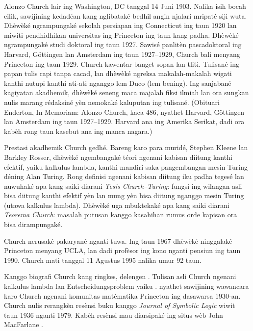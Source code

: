 \documentclass[../../../include/open-logic-section]{subfiles}
\begin{document}



Alonzo Church lair ing Washington, DC tanggal 14 Juni 1903.
Nalika isih bocah cilik, sawijining kedadéan kang nglibataké
bedhil angin njalari mripaté siji wuta. Dhèwèké ngrampungaké
sekolah persiapan ing Connecticut ing taun 1920 lan miwiti
pendhidhikan universitas ing Princeton ing taun kang padha.
Dhèwèké ngrampungaké studi doktoral ing taun 1927. Sawisé
panlitèn pascadoktoral ing Harvard, Göttingen lan Amsterdam
ing taun 1927--1929, Church bali menyang Princeton ing
taun 1929. Church kawentar banget sopan lan tliti.
Tulisané ing papan tulis rapi tanpa cacad, lan dhèwèké
ngreksa makalah-makalah wigati kanthi nutupi kanthi ati-ati
nganggo lem Duco (lem bening). Ing sanjabané kagiyatan
akadhemik, dhèwèké seneng maca majalah fiksi ilmiah lan
ora sungkan nulis marang rédaksiné yèn nemokaké
kaluputan ing tulisané.
(Obituari Enderton, In Memoriam: Alonzo Church, kaca 486, nyathet Harvard, Göttingen lan Amsterdam ing taun 1927--1929. Harvard ana ing Amerika Serikat, dadi ora kabèh rong taun kasebut ana ing manca nagara.)

Prestasi akadhemik Church gedhé. Bareng karo para muridé,
Stephen Kleene lan Barkley Rosser, dhèwèké ngembangaké
téori ngenani kabisan diitung kanthi efektif, yaiku
kalkulus lambda, kanthi mandiri saka pangembangan mesin
Turing déning Alan Turing. Rong definisi ngenani
kabisan diitung iku padha tegesé lan nuwuhaké apa kang
saiki diarani \emph{Tesis Church--Turing}: fungsi ing
wilangan asli bisa diitung kanthi efektif yèn lan
mung yèn bisa diitung nganggo mesin Turing (utawa
kalkulus lambda). Dhèwèké uga mbuktekaké apa kang
saiki diarani \emph{Teorema Church}: masalah putusan
kanggo kasahihan rumus orde kapisan ora bisa
dirampungaké.

Church nerusaké pakaryané nganti tuwa. Ing taun 1967
dhèwèké ninggalaké Princeton menyang UCLA, lan dadi
profèsor ing kono nganti pensiun ing taun 1990. Church
mati tanggal 11 Agustus 1995 nalika umur 92 taun.

\begin{reading}
Kanggo biografi Church kang ringkes, delengen
\citet{EndertonND}. Tulisan asli Church ngenani
kalkulus lambda lan Entscheidungsproblem
yaiku \citet{Church1936,Church1936a}.
\citet{Aspray1984} nyathet sawijining wawancara
karo Church ngenani komunitas matématika Princeton
ing dasawarsa 1930-an.
Church nulis rerangkèn resènsi buku kanggo \emph{Journal of
Symbolic Logic} wiwit taun 1936 nganti 1979. Kabèh
resènsi mau diarsipaké ing situs wèb John
MacFarlane \citep{MacFarlane2015}.
\end{reading}
\end{document}
